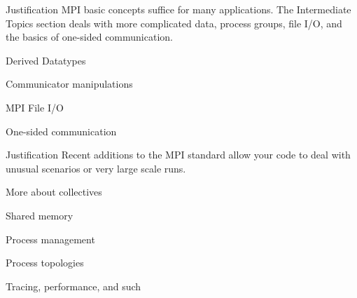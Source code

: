 \documentclass[11pt,headernav]{beamer}
\begin{document}

\begin{frame}{Justification}
  MPI basic concepts suffice for many applications.  The Intermediate
  Topics section deals with more complicated data, process groups,
  file I/O, and the basics of one-sided communication.
\end{frame}

 {Derived Datatypes}


 {Communicator manipulations}


 {MPI File I/O}


 {One-sided communication}
 



\begin{frame}{Justification}
  Recent additions to the MPI standard allow your 
  code to deal with unusual scenarios or very large scale runs.
\end{frame}

 {More about collectives}


 {Shared memory}


 {Process management}


 {Process topologies}



 {Tracing, performance, and such}

\end{document}
